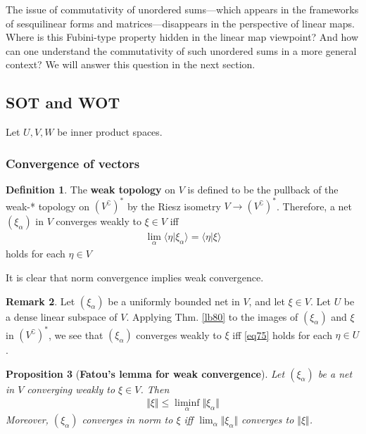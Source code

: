 \documentclass[12pt,b5paper,notitlepage]{article}
\theoremstyle{definition}
\newtheorem{df}{Definition}[subsection]
\newtheorem{rem}[df]{Remark}
\theoremstyle{plain}
\newtheorem{pp}[df]{Proposition}
\newcommand{\bk}[1]{\langle {#1}\rangle}
\newcommand{\Co}{\complement}
\numberwithin{equation}{section}
\begin{document}
The issue of commutativity of unordered sums---which appears in the frameworks of sesquilinear forms and matrices---disappears in the perspective of linear maps. Where is this Fubini-type property hidden in the linear map viewpoint? And how can one understand the commutativity of such unordered sums in a more general context? We will answer this question in the next section.




\subsection{SOT and WOT}



Let $U,V,W$ be inner product spaces.

\subsubsection{Convergence of vectors}


\begin{df}
The \textbf{weak topology} on $V$  is defined to be the pullback of the weak-* topology on $(V^\Co)^*$ by the Riesz isometry $V\rightarrow (V^\Co)^*$. Therefore, a net $(\xi_\alpha)$ in $V$ converges weakly to $\xi \in V$ iff
\begin{align}\label{eq75}
\lim_\alpha\bk{\eta|\xi_\alpha}=\bk{\eta|\xi}
\end{align}
holds for each $\eta\in V$
\end{df}

It is clear that norm convergence implies weak convergence.


\begin{rem}
Let $(\xi_\alpha)$ be a uniformly bounded net in $V$, and let $\xi\in V$. Let $U$ be a dense linear subspace of $V$. Applying Thm. \ref{lb80} to the images of $(\xi_\alpha)$ and $\xi$ in $(V^\Co)^*$, we see that $(\xi_\alpha)$ converges weakly to $\xi$ iff \eqref{eq75} holds for each $\eta\in U$. 
\end{rem}



\begin{pp}[\textbf{Fatou's lemma for weak convergence}]\label{lb153} 
Let $(\xi_\alpha)$ be a net in $V$ converging weakly to $\xi\in V$. Then
\begin{align}\label{eq76}
\Vert\xi\Vert\leq\liminf_\alpha\Vert\xi_\alpha\Vert
\end{align}
Moreover, $(\xi_\alpha)$ converges in norm to $\xi$ iff  $\lim_\alpha\Vert\xi_\alpha\Vert$ converges to $\Vert\xi\Vert$.
\end{pp}
\end{document}
